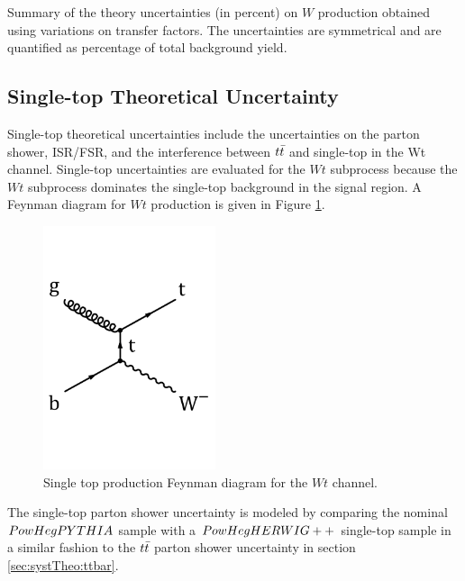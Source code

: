   \begin{table}[!h]
    \caption{Summary of the theory uncertainties (in percent) on $W$ production obtained using variations on transfer factors. The uncertainties are symmetrical and are quantified as percentage of total background yield.}
    \label{tab:WThSyst}
    \begin{center} %
    
    \end{center}
  \end{table}        

\subsection{Single-top Theoretical Uncertainty}

\indent Single-top theoretical uncertainties include the uncertainties on the parton shower, ISR/FSR, and the interference between $t\bar{t}$ and single-top in the Wt channel.  Single-top uncertainties are evaluated for the $Wt$ subprocess because the $Wt$ subprocess dominates the single-top background in the signal region.  A Feynman diagram for $Wt$ production is given in Figure \ref{fig:ST:feyn}.\\

\begin{figure}[h!]
\begin{center}
	\includegraphics[width=0.45\textwidth]{figures/feynDiag/tW_chan.png}
\end{center}
\caption[Single top production Feynman diagram for the $Wt$ channel.]{Single top production Feynman diagram for the $Wt$ channel. }
\label{fig:ST:feyn}
\end{figure}

\indent The single-top parton shower uncertainty is modeled by comparing the nominal $PowHegPYTHIA$ sample with a $PowHegHERWIG++$ single-top sample in a similar fashion to the $t\bar{t}$ parton shower uncertainty in section \ref{sec:systTheo:ttbar}.  \\

